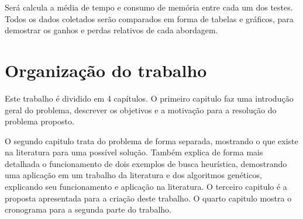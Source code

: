 Será calcula a média de tempo e consumo de memória entre cada um dos testes. Todos os dados coletados serão comparados em forma de tabelas e gráficos, para demostrar os ganhos e perdas relativos de cada abordagem.

\section{Organização do trabalho}
Este trabalho é dividido em 4 capítulos. O primeiro capitulo faz uma introdução geral do problema, descrever os objetivos e a motivação para a resolução do problema proposto.

O segundo capitulo trata do problema de forma separada, mostrando o que existe na literatura para uma possível solução. Também explica de forma mais detalhada o funcionamento de dois exemplos de busca heurística, demostrando uma aplicação em um trabalho da literatura e dos algoritmos genéticos, explicando seu funcionamento e aplicação na literatura.
O terceiro capitulo é a proposta apresentada para a criação deste trabalho.
O quarto capitulo mostra o cronograma para a segunda parte do trabalho.
